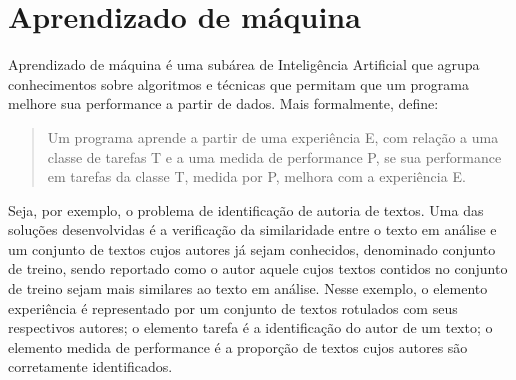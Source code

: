 \chapter{Aprendizado de máquina}

Aprendizado de máquina é uma subárea de Inteligência Artificial que agrupa conhecimentos sobre algoritmos e técnicas que permitam que um programa melhore sua performance a partir de dados. Mais formalmente, \cite[p.2, tradução nossa]{Tom_mitchell} define:

\begin{quote}
Um programa aprende a partir de uma experiência E, com relação a uma classe de tarefas T e a uma medida de performance P, se sua performance em tarefas da classe T, medida por P, melhora com a experiência E.
\end{quote}

Seja, por exemplo, o problema de identificação de autoria de textos. Uma das soluções desenvolvidas é a verificação da similaridade entre o texto em análise e um conjunto de textos cujos autores já sejam conhecidos, denominado conjunto de treino, sendo reportado como o autor aquele cujos textos contidos no conjunto de treino sejam mais similares ao texto em análise. Nesse exemplo, o elemento experiência é representado por um conjunto de textos rotulados com seus respectivos autores; o elemento tarefa é a identificação do autor de um texto; o elemento medida de performance é a proporção de textos cujos autores são corretamente identificados.



\cite{Mitchell_discipline}


\cite{ML_debt} 
\cite{ML_know}
